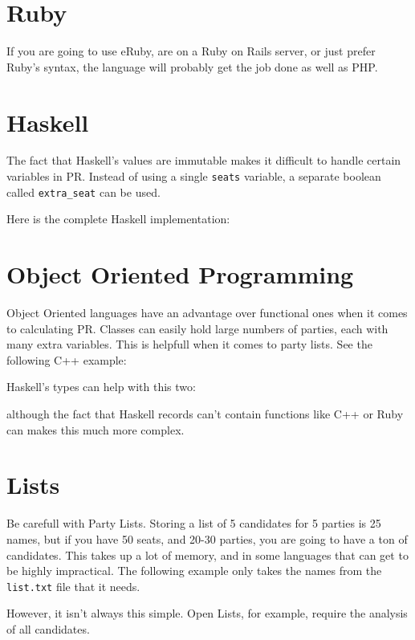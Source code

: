 \documentclass{article}
\begin{document}
    \section{Ruby}

    If you are going to use eRuby, are on a Ruby on Rails server, or just prefer Ruby's syntax, the language will probably get the job done as well as PHP.

    

    \section{Haskell}

    The fact that Haskell's values are immutable makes it difficult to handle certain variables in PR. Instead of using a single \texttt{seats} variable, a separate boolean called \verb|extra_seat| can be used.

    
    
    Here is the complete Haskell implementation:

    

    \section{Object Oriented Programming}

    Object Oriented languages have an advantage over functional ones when it comes to calculating PR. Classes can easily hold large numbers of parties, each with many extra variables. This is helpfull when it comes to party lists. See the following C++ example:

    

    Haskell's types can help with this two:

    

    although the fact that Haskell records can't contain functions like C++ or Ruby can makes this much more complex. 

    \section{Lists}

    Be carefull with Party Lists. Storing a list of 5 candidates for 5 parties is 25 names, but if you have 50 seats, and 20-30 parties, you are going to have a ton of candidates. This takes up a lot of memory, and in some languages that can get to be highly impractical. The following example only takes the names from the \verb|list.txt| file that it needs.

    

    However, it isn't always this simple. Open Lists, for example, require the analysis of all candidates.

    
\end{document}
